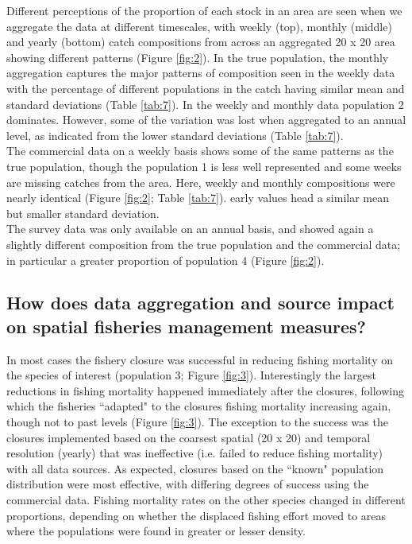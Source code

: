 \documentclass[review]{elsarticle}
\begin{document}
Different perceptions of the proportion of each stock in an area are seen when
we aggregate the data at different timescales, with weekly (top), monthly
(middle) and yearly (bottom) catch compositions from across an aggregated 20 x
20 area showing different patterns (Figure \ref{fig:2}). In the true
population, the monthly aggregation captures the major patterns of composition
seen in the weekly data with the percentage of different populations in the
catch having similar mean and standard deviations (Table \ref{tab:7}). In the
weekly and monthly data population 2 dominates. However, some of the variation
was lost when aggregated to an annual level, as indicated from the lower
standard deviations (Table \ref{tab:7}).\\

The commercial data on a weekly basis shows some of the same patterns as the
true population, though the population 1  is less well
represented and some weeks are missing catches from the area. Here, weekly and
monthly compositions were nearly identical (Figure \ref{fig:2}; Table
\ref{tab:7}). early values head a similar mean but
smaller standard deviation.\\

The survey data was only available on an annual basis, and showed again a
slightly different composition from the true population and the commercial
data; in particular a greater proportion of population 4 (Figure \ref{fig:2}).

\subsection{How does data aggregation and source impact on spatial fisheries
	management measures?}


In most cases the fishery closure was successful in reducing fishing mortality
on the species of interest (population 3; Figure \ref{fig:3}). Interestingly
the largest reductions in fishing mortality happened immediately after the
closures, following which the fisheries ``adapted" to the closures  fishing
mortality increasing again, though not to past levels (Figure \ref{fig:3}).
The exception to the success was the closures implemented based on the coarsest
spatial (20 x 20) and temporal resolution (yearly) that was ineffective (i.e.
failed to reduce fishing mortality) with all data sources. As expected,
closures based on the ``known" population distribution were most effective,
with differing degrees of success using the commercial data. Fishing mortality
rates on the other species changed in different proportions, depending on
whether the displaced fishing effort moved to areas where the populations were
found in greater or lesser density. \\
\end{document}
